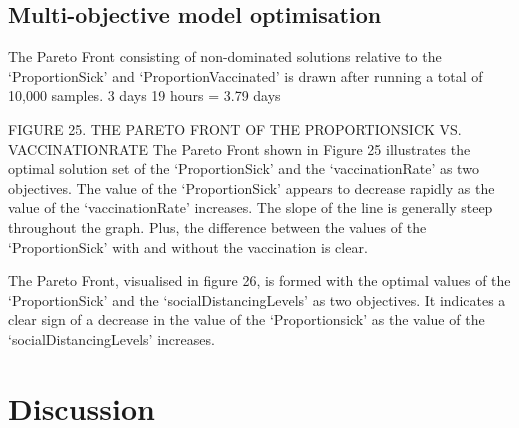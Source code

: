 \documentclass[smallextended]{svjour3}       %
\begin{document}
\subsection{Multi-objective model optimisation}


The Pareto Front consisting of non-dominated solutions relative to the ‘ProportionSick’ and ‘ProportionVaccinated’ is drawn after running a total of 10,000 samples.
3 days 19 hours = 3.79 days


FIGURE 25. THE PARETO FRONT OF THE PROPORTIONSICK VS. VACCINATIONRATE
The Pareto Front shown in Figure 25 illustrates the optimal solution set of the ‘ProportionSick’ and the ‘vaccinationRate’ as two objectives. The value of the ‘ProportionSick’ appears to decrease rapidly as the value of the ‘vaccinationRate’ increases. The slope of the line is generally steep throughout the graph. Plus, the difference between the values of the ‘ProportionSick’ with and without the vaccination is clear.


The Pareto Front, visualised in figure 26, is formed with the optimal values of the ‘ProportionSick’ and the ‘socialDistancingLevels’ as two objectives. It indicates a clear sign of a decrease in the value of the ‘Proportionsick’ as the value of the ‘socialDistancingLevels’ increases.


\section{Discussion}
\end{document}
